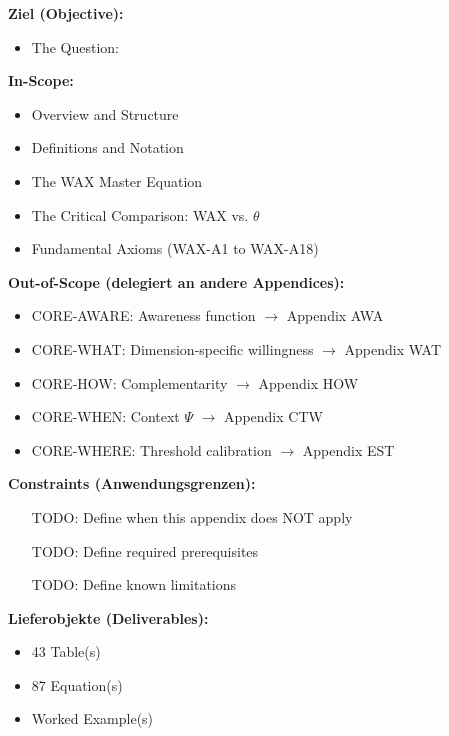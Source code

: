 

\begin{tcolorbox}[
    colback=orange!5!white,
    colframe=orange!75!black,
    title={\textbf{Appendix Scope: Ziel / In-Scope / Out-of-Scope / Constraints}},
    fonttitle=\bfseries
]

\textbf{Ziel (Objective):}
\begin{itemize}[nosep]
    \item The Question:
\end{itemize}

\textbf{In-Scope:}
\begin{itemize}[nosep]
    \item Overview and Structure
    \item Definitions and Notation
    \item The WAX Master Equation
    \item The Critical Comparison: WAX vs. $\theta$
    \item Fundamental Axioms (WAX-A1 to WAX-A18)
\end{itemize}

\textbf{Out-of-Scope (delegiert an andere Appendices):}
\begin{itemize}[nosep]
    \item CORE-AWARE: Awareness function $\rightarrow$ Appendix AWA
    \item CORE-WHAT: Dimension-specific willingness $\rightarrow$ Appendix WAT
    \item CORE-HOW: Complementarity $\rightarrow$ Appendix HOW
    \item CORE-WHEN: Context $\Psi$ $\rightarrow$ Appendix CTW
    \item CORE-WHERE: Threshold calibration $\rightarrow$ Appendix EST
\end{itemize}

\textbf{Constraints (Anwendungsgrenzen):}
\begin{itemize}[nosep]
    \item [TODO: Define when this appendix does NOT apply]
    \item [TODO: Define required prerequisites]
    \item [TODO: Define known limitations]
\end{itemize}

\textbf{Lieferobjekte (Deliverables):}
\begin{itemize}[nosep]
    \item 43 Table(s)
    \item 87 Equation(s)
    \item Worked Example(s)
\end{itemize}

\end{tcolorbox}


